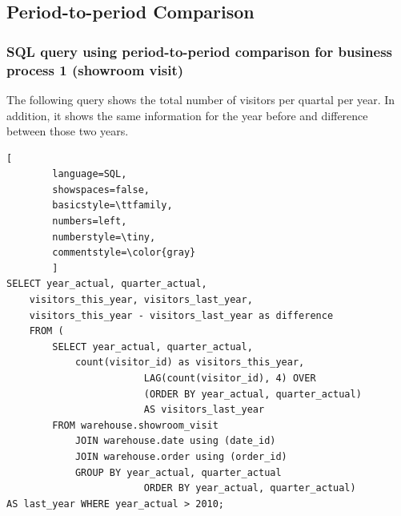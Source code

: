 \documentclass[letterpaper,12pt]{article}
\begin{document}
\subsection{Period-to-period Comparison}

\subsubsection{SQL query using period-to-period comparison for business process 1 (showroom visit)}

The following query shows the total number of visitors per quartal per year. In addition, it shows the same information for the year before and difference between those two years.

\begin{lstlisting}[
        language=SQL,
        showspaces=false,
        basicstyle=\ttfamily,
        numbers=left,
        numberstyle=\tiny,
        commentstyle=\color{gray}
        ]
SELECT year_actual, quarter_actual, 
	visitors_this_year, visitors_last_year,
	visitors_this_year - visitors_last_year as difference
	FROM (
		SELECT year_actual, quarter_actual,
			count(visitor_id) as visitors_this_year,
                        LAG(count(visitor_id), 4) OVER 
                        (ORDER BY year_actual, quarter_actual) 
                        AS visitors_last_year 
		FROM warehouse.showroom_visit
			JOIN warehouse.date using (date_id)
			JOIN warehouse.order using (order_id)
			GROUP BY year_actual, quarter_actual
                        ORDER BY year_actual, quarter_actual) 
AS last_year WHERE year_actual > 2010;
\end{lstlisting}
\end{document}
